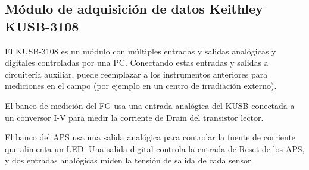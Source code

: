 \subsection{Módulo de adquisición de datos Keithley KUSB-3108}
El KUSB-3108 es un módulo con múltiples entradas y salidas 
analógicas y digitales controladas por una PC.
Conectando estas entradas y salidas a circuitería auxiliar,
puede reemplazar a los instrumentos anteriores para mediciones en el campo
(por ejemplo en un centro de irradiación externo).

El banco de medición del FG usa una entrada analógica del KUSB
conectada a un conversor I-V 
para medir la corriente de Drain del transistor lector.

El banco del APS usa una salida analógica 
para controlar la fuente de corriente que alimenta un LED.
Una salida digital controla la entrada de Reset de los APS,
y dos entradas analógicas miden la tensión de salida de cada sensor.
